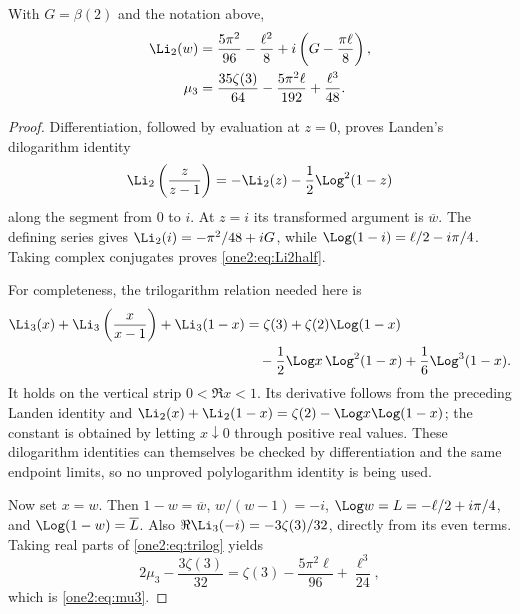 \begin{lemma}
\label{one2:lem:halfpoint}
With $G=\beta(2)$ and the notation above,
\begin{align}
 \Li_2(w)&=\frac{5\pi^2}{96}-\frac{\ell^2}{8}
              +i\left(G-\frac{\pi\ell}{8}\right),
       \label{one2:eq:Li2half}\\
 \mu_3&=\frac{35\zeta(3)}{64}-\frac{5\pi^2\ell}{192}
              +\frac{\ell^3}{48}.
       \label{one2:eq:mu3}
\end{align}
\end{lemma}
\begin{proof}
Differentiation, followed by evaluation at $z=0$, proves Landen's
dilogarithm identity
\[
 \Li_2\left(\frac z{z-1}\right)
       =-\Li_2(z)-\frac12\Log^2(1-z)
\]
along the segment from $0$ to $i$.  At $z=i$ its transformed argument
is $\overline w$.  The defining series gives
$\Li_2(i)=-\pi^2/48+iG$, while
$\Log(1-i)=\ell/2-i\pi/4$.  Taking complex conjugates proves
\eqref{one2:eq:Li2half}.

For completeness, the trilogarithm relation needed here is
\begin{align}
 \Li_3(x)+\Li_3\left(\frac x{x-1}\right)+\Li_3(1-x)
 &=\zeta(3)+\zeta(2)\Log(1-x)\notag\\
 &\quad-\frac12\Log x\,\Log^2(1-x)
       +\frac16\Log^3(1-x).
 \label{one2:eq:trilog}
\end{align}
It holds on the vertical strip $0<\Re x<1$.  Its derivative follows
from the preceding Landen identity and
$\Li_2(x)+\Li_2(1-x)=\zeta(2)-\Log x\Log(1-x)$;
the constant is obtained by letting $x\downarrow0$ through positive
real values.  These dilogarithm identities can themselves be checked
by differentiation and the same endpoint limits, so no
unproved polylogarithm identity is being used.

Now set $x=w$.  Then $1-w=\overline w$, $w/(w-1)=-i$,
$\Log w=L=-\ell/2+i\pi/4$, and
$\Log(1-w)=\overline L$.  Also
$\Re\Li_3(-i)=-3\zeta(3)/32$, directly from its even terms.
Taking real parts of \eqref{one2:eq:trilog} yields
\[
 2\mu_3-\frac{3\zeta(3)}{32}
 =\zeta(3)-\frac{5\pi^2\ell}{96}+\frac{\ell^3}{24},
\]
which is \eqref{one2:eq:mu3}.
\end{proof}

